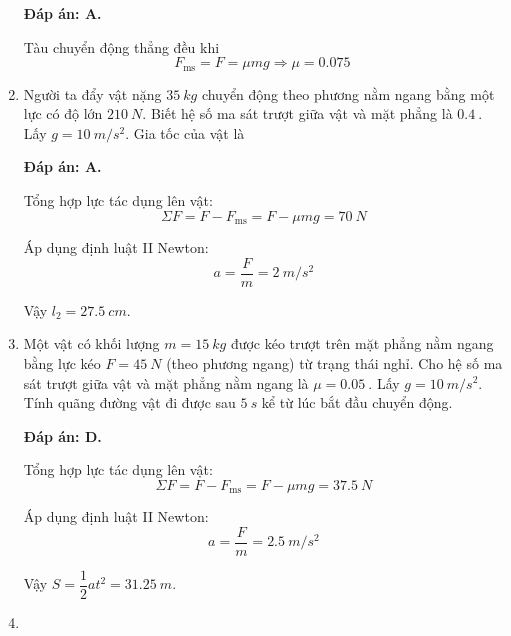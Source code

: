 \begin{enumerate}[label=\bfseries Câu \arabic*:,leftmargin=1.5cm]
	\hideall
	{	\textbf{Đáp án: A.}
		
		Tàu chuyển động thẳng đều khi
		$$F_\text{ms} = F = \mu mg \Rightarrow \mu = \SI{0.075}{}$$
	}
	
	\item {}
	
	
	{Người ta đẩy vật nặng $\SI{35}{kg}$ chuyển động theo phương nằm ngang bằng một lực có độ lớn $\SI{210}{N}$. Biết hệ số ma sát trượt giữa vật và mặt phẳng là $\SI{0.4}{}$. Lấy $g=\SI{10}{m/s^2}$. Gia tốc của vật là
	}
	
	\hideall
	{	\textbf{Đáp án: A.}	
		
		Tổng hợp lực tác dụng lên vật:
		$$\Sigma F= F-F_\text{ms} = F - \mu mg = \SI{70}{N}$$
		
		Áp dụng định luật II Newton:
		$$a=\dfrac{F}{m} = \SI{2}{m/s^2}$$
		
		Vậy $l_2 = \SI{27.5}{cm}$.
	}
	\item {}
	
	
	{Một vật có khối lượng $m=\SI{15}{kg}$ được kéo trượt trên mặt phẳng nằm ngang bằng lực kéo $F=\SI{45}{N}$ (theo phương ngang) từ trạng thái nghỉ. Cho hệ số ma sát trượt giữa vật và mặt phẳng nằm ngang là $\mu = \SI{0.05}{}$. Lấy $g=\SI{10}{m/s^2}$. Tính quãng đường vật đi được sau $\SI{5}{s}$ kể từ lúc bắt đầu chuyển động.
	}
	
	\hideall
	{	\textbf{Đáp án: D.}	
		
		Tổng hợp lực tác dụng lên vật:
		$$\Sigma F= F-F_\text{ms} = F - \mu mg = \SI{37.5}{N}$$
		
		Áp dụng định luật II Newton:
		$$a=\dfrac{F}{m} = \SI{2.5}{m/s^2}$$
		
		Vậy $S=\dfrac{1}{2}at^2 = \SI{31.25}{m}$.
	}
	\item {}
	

\end{enumerate}
